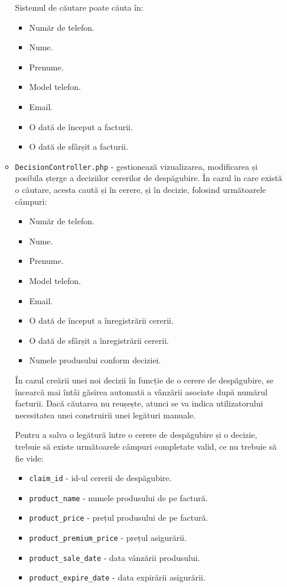 \begin{itemize}
\begin{itemize}
					Sistemul de căutare poate căuta în:
					\begin{itemize}
						\item Număr de telefon.
						\item Nume.
						\item Prenume.
						\item Model telefon.
						\item Email.
						\item O dată de început a facturii.
						\item O dată de sfârșit a facturii.
					\end{itemize}
				\item \verb|DecisionController.php| - gestionează vizualizarea, modificarea și posibila șterge a deciziilor cererilor de despăgubire.
				În cazul în care există o căutare, acesta caută și în cerere, și în decizie, folosind următoarele câmpuri:
				\begin{itemize}
						\item Număr de telefon.
						\item Nume.
						\item Prenume.
						\item Model telefon.
						\item Email.
						\item O dată de început a înregistrării cererii.
						\item O dată de sfârșit a înregistrării cererii.
						\item Numele produsului conform deciziei.
				\end{itemize}

				În cazul creării unei noi decizii în funcție de o cerere de despăgubire, se încearcă mai întâi găsirea automată a vânzării asociate după numărul facturii.
				Dacă căutarea nu reușește, atunci se va indica utilizatorului necesitatea unei construirii unei legături manuale.

				Pentru a salva o legătură între o cerere de despăgubire și o decizie, trebuie să existe următoarele câmpuri completate valid, ce nu trebuie să fie vide:
				\begin{itemize}
					\item \verb|claim_id| - id-ul cererii de despăgubire.
					\item \verb|product_name| - numele produsului de pe factură.
					\item \verb|product_price| - prețul produsului de pe factură.
					\item \verb|product_premium_price| - prețul asigurării.
					\item \verb|product_sale_date| - data vânzării produsului.
					\item \verb|product_expire_date| - data expirării asigurării.
				\end{itemize}


\end{itemize}
\end{itemize}
